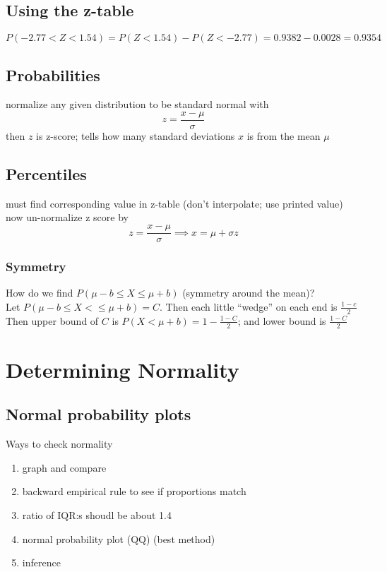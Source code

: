 \subsection{Using the z-table}  %
\begin{equation}
    P(-2.77<Z<1.54)=P(Z<1.54)-P(Z<-2.77)=0.9382 - 0.0028 = 0.9354
\end{equation}

\subsection{Probabilities}  %
normalize any given distribution to be standard normal with
\begin{equation}
    z=\frac{x-\mu}{\sigma}
\end{equation}
then $z$ is z-score; tells how many standard deviations $x$ is from the mean $\mu$
\subsection{Percentiles}  %
must find corresponding value in z-table (don't interpolate; use printed value) \\
now un-normalize z score by
\begin{equation}
    z=\frac{x-\mu}{\sigma}  \implies x=\mu+\sigma z
\end{equation}

\subsubsection{Symmetry}
How do we find $P(\mu-b\leq X\leq \mu+b)$ (symmetry around the mean)?\\
Let $P(\mu-b\leq X<\leq \mu+b)=C$. Then each little ``wedge'' on each end is \(\frac{1-c}{2}\)\\
Then upper bound of $C$ is \(P(X<\mu+b)=1-\frac{1-C}{2}\); and lower bound is $\frac{1-C}{2}$

\section{Determining Normality}  %


\subsection{Normal probability plots}  %
Ways to check normality
\begin{enumerate}
    \item graph and compare
    \item backward empirical rule to see if proportions match
    \item ratio of IQR:s shoudl be about 1.4
    \item normal probability plot (QQ) (best method)
    \item inference
\end{enumerate}

